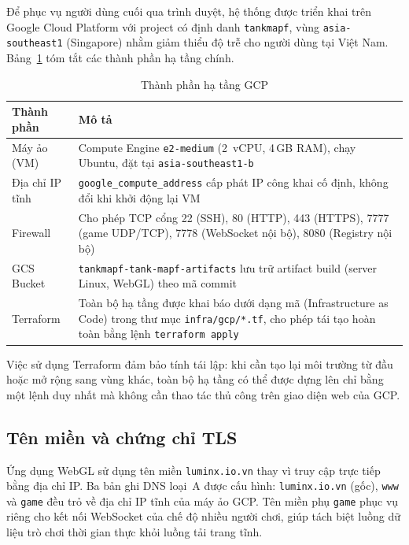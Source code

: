 \documentclass[../DoAn.tex]{subfiles}
\begin{document}
Để phục vụ người dùng cuối qua trình duyệt, hệ thống được triển khai trên Google Cloud
Platform với project có định danh \texttt{tankmapf}, vùng
\texttt{asia-\allowbreak southeast1} (Singapore)
nhằm giảm thiểu độ trễ cho người dùng tại Việt Nam. Bảng~\ref{tab:gcp_infra} tóm tắt các
thành phần hạ tầng chính.

\begin{table}[htbp]
\centering
\caption{Thành phần hạ tầng GCP}
\label{tab:gcp_infra}
\small
\begin{tabular}{|l|p{9cm}|}
\hline
\textbf{Thành phần} & \textbf{Mô tả} \\ \hline
Máy ảo (VM)  & Compute Engine \texttt{e2-medium} (2~vCPU, 4\,GB RAM),
               chạy Ubuntu, đặt tại \texttt{asia-southeast1-b} \\
\hline
Địa chỉ IP tĩnh & \texttt{google\_compute\_address} cấp phát IP công khai
                   cố định, không đổi khi khởi động lại VM \\
\hline
Firewall     & Cho phép TCP cổng 22 (SSH), 80 (HTTP), 443 (HTTPS),
               7777 (game UDP/TCP), 7778 (WebSocket nội bộ), 8080 (Registry nội bộ) \\
\hline
GCS Bucket   & \texttt{tankmapf-tank-mapf-artifacts} lưu trữ artifact build
               (server Linux, WebGL) theo mã commit \\
\hline
Terraform    & Toàn bộ hạ tầng được khai báo dưới dạng mã (Infrastructure as Code)
               trong thư mục \texttt{infra/gcp/*.tf}, cho phép tái tạo hoàn toàn
               bằng lệnh \texttt{terraform apply} \\
\hline
\end{tabular}
\end{table}

Việc sử dụng Terraform đảm bảo tính tái lập: khi cần tạo lại môi trường từ đầu hoặc mở
rộng sang vùng khác, toàn bộ hạ tầng có thể được dựng lên chỉ bằng một lệnh duy nhất mà
không cần thao tác thủ công trên giao diện web của GCP.

\subsection{Tên miền và chứng chỉ TLS}

Ứng dụng WebGL sử dụng tên miền \texttt{luminx.io.vn} thay vì truy cập trực tiếp bằng địa
chỉ IP. Ba bản ghi DNS loại~A được cấu hình: \texttt{luminx.io.vn} (gốc), \texttt{www} và
\texttt{game} đều trỏ về địa chỉ IP tĩnh của máy ảo GCP. Tên miền phụ \texttt{game} phục
vụ riêng cho kết nối WebSocket của chế độ nhiều người chơi, giúp tách biệt luồng dữ liệu
trò chơi thời gian thực khỏi luồng tải trang tĩnh.
\end{document}

